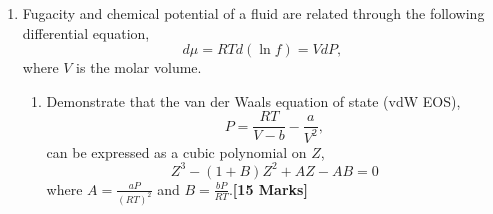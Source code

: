 \documentclass[12pts,a4paper,amsmath,amssymb,floatfix]{article}%
\newcommand{\frc}{\displaystyle\frac}
\begin{document}
\begin{enumerate}[label=\bfseries Problem \arabic*]
{   \begin{itemize}
      \item Since the vapour mole fractions are unknown, we should start from the main composition constraint, $\sum\limits_{i=1}^{2}y_{i} = 1$.  
      \item Replacing $y_{i}=x_{i}\gamma_{i}P_{i}^{\text{sat}}/P$,~\hfill{\bf [2/15]}
         \begin{displaymath}
            x_{1}\gamma_{1}P_{1}^{\text{sat}} + x_{2}\gamma_{2}P_{2}^{\text{sat}} = P
         \end{displaymath}
      \item For $x_{1} =$ 0.01, $x_{2} =$ 0.99, $C_{12} =$ 0.1173 and $C_{21} =$ 0.4227 $\Longrightarrow$ $\gamma_{1} =$ 13.0695 and $\gamma_{2} =$ 1.0007~\hfill{\bf [2/15]}
      \item With these numerical values, we can replace into the equation above,
         \begin{displaymath}
            (0.01)(13.0695)\exp\left[14.71712 - \frc{2975.95}{T-34.5228}\right] + (0.99)(1.000)\exp\left[16.5362 - \frc{3985.44}{T-38.9974}\right] =  101.3
         \end{displaymath}
         Resulting in {\bf $T=$ 361.71 K} -- the bubble point temperature of this acetone-water mixture.~\hfill{\bf [6/15]}
      \item At this temperature, the saturation pressure of acetone and water are $P_{1}^{\text{sat}}=$ 276.32 kPa and $P_{2}^{\text{sat}}=$ 65.78 kPa, respectively.~\hfill{\bf [2/15]}
      \item The vapour composition is~\hfill{\bf [3/15]}
         \begin{displaymath}
             \mathbf{y_{1} =\frc{x_{1}\gamma_{1}P_{1}^{\text{sat}}}{P} = 0.3565}\;\;\;\text{ and }\;\;\;\; \mathbf{y_{2} = 0.6435}
         \end{displaymath} 
   \end{itemize}}
\clearpage

\item\label{Example:3} Fugacity and chemical potential of a fluid are related through the following differential equation,
      \begin{displaymath}
           d\mu = RTd\left(\ln f\right) = VdP,
      \end{displaymath}
      where $V$ is the molar volume.
      \begin{enumerate}
        \item Demonstrate that the van der Waals equation of state (vdW EOS),
               \begin{displaymath}
                  P = \frc{RT}{V-b} - \frc{a}{V^{2}},
               \end{displaymath}
               can be expressed as a cubic polynomial on $Z$,
               \begin{displaymath}
                   Z^{3}-\left(1+B\right)Z^{2} + AZ -AB = 0
               \end{displaymath}
               where $A= \frc{aP}{\left(RT\right)^{2}}$ and $B = \frc{bP}{RT}$.\hfill{\bf [15 Marks]}


\end{enumerate}
\end{enumerate}
\end{document}
